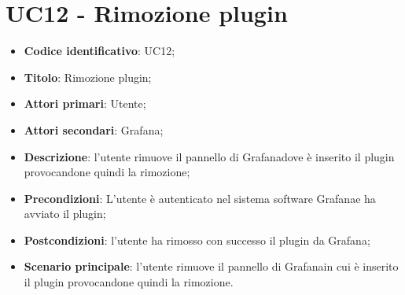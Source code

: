 \section{UC12 - Rimozione plugin}
\begin{itemize}
    \item \textbf{Codice identificativo}: UC12;
    \item \textbf{Titolo}: Rimozione plugin;
    \item \textbf{Attori primari}: Utente;
    \item \textbf{Attori secondari}: Grafana\glo;
    \item \textbf{Descrizione}: l'utente rimuove il pannello di Grafana\glosp dove è inserito il plugin provocandone quindi la rimozione;
    \item \textbf{Precondizioni}: L'utente è autenticato nel sistema software Grafana\glosp e ha avviato il plugin;
    \item \textbf{Postcondizioni}: l'utente ha rimosso con successo il plugin da Grafana\glo;
    \item \textbf{Scenario principale}: l'utente rimuove il pannello di Grafana\glosp in cui è inserito il plugin provocandone quindi la rimozione.
\end{itemize}